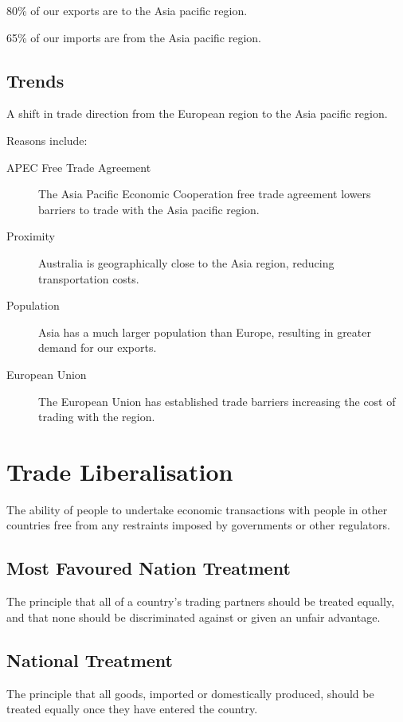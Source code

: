 \documentclass[a4paper,11pt]{report}
\begin{document}
80\% of our exports are to the Asia pacific region.

65\% of our imports are from the Asia pacific region.

\subsection{Trends}

A shift in trade direction from the European region to the Asia pacific region.

Reasons include:

\begin{description}
\item [APEC Free Trade Agreement] The Asia Pacific Economic Cooperation free
	trade agreement lowers barriers to trade with the Asia pacific region.
\item [Proximity] Australia is geographically close to the Asia region,
	reducing transportation costs.
\item [Population] Asia has a much larger population than Europe, resulting in
	greater demand for our exports.
\item [European Union] The European Union has established trade barriers
	increasing the cost of trading with the region.
\end{description}


\section{Trade Liberalisation}

The ability of people to undertake economic transactions with people in other
countries free from any restraints imposed by governments or other regulators.

\subsection{Most Favoured Nation Treatment}

The principle that all of a country's trading partners should be treated
equally, and that none should be discriminated against or given an unfair
advantage.

\subsection{National Treatment}

The principle that all goods, imported or domestically produced, should be
treated equally once they have entered the country.
\end{document}
